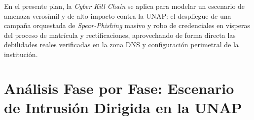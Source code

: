 \begin{center}
\end{center}

En el presente plan, la \textit{Cyber Kill Chain} se aplica para modelar un escenario de amenaza verosímil y de alto impacto contra la UNAP: el despliegue de una campaña orquestada de \textit{Spear-Phishing} masivo y robo de credenciales en vísperas del proceso de matrícula y rectificaciones, aprovechando de forma directa las debilidades reales verificadas en la zona DNS y configuración perimetral de la institución.

\section{Análisis Fase por Fase: Escenario de Intrusión Dirigida en la UNAP}

